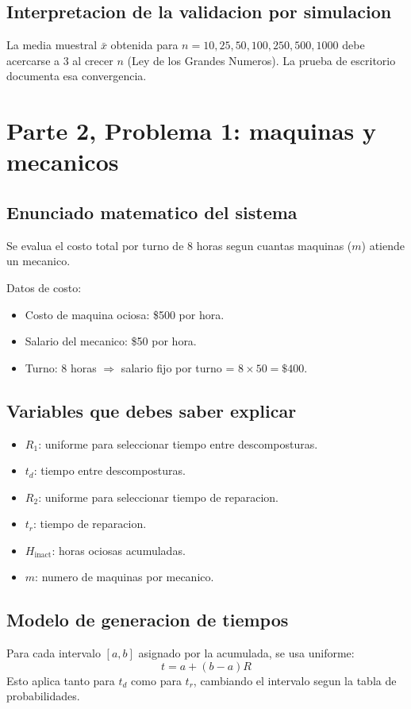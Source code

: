 \documentclass[12pt,a4paper]{article}
\begin{document}
\subsection{Interpretacion de la validacion por simulacion}
La media muestral $\bar x$ obtenida para $n=10,25,50,100,250,500,1000$ debe acercarse a 3 al crecer $n$ (Ley de los Grandes Numeros). La prueba de escritorio documenta esa convergencia.

\section{Parte 2, Problema 1: maquinas y mecanicos}

\subsection{Enunciado matematico del sistema}
Se evalua el costo total por turno de 8 horas segun cuantas maquinas ($m$) atiende un mecanico.

Datos de costo:
\begin{itemize}
  \item Costo de maquina ociosa: \$500 por hora.
  \item Salario del mecanico: \$50 por hora.
  \item Turno: 8 horas $\Rightarrow$ salario fijo por turno = $8\times 50=\$400$.
\end{itemize}

\subsection{Variables que debes saber explicar}
\begin{itemize}
  \item $R_1$: uniforme para seleccionar tiempo entre descomposturas.
  \item $t_d$: tiempo entre descomposturas.
  \item $R_2$: uniforme para seleccionar tiempo de reparacion.
  \item $t_r$: tiempo de reparacion.
  \item $H_{\text{inact}}$: horas ociosas acumuladas.
  \item $m$: numero de maquinas por mecanico.
\end{itemize}

\subsection{Modelo de generacion de tiempos}
Para cada intervalo $[a,b]$ asignado por la acumulada, se usa uniforme:
\[
t=a+(b-a)R
\]
Esto aplica tanto para $t_d$ como para $t_r$, cambiando el intervalo segun la tabla de probabilidades.
\end{document}
